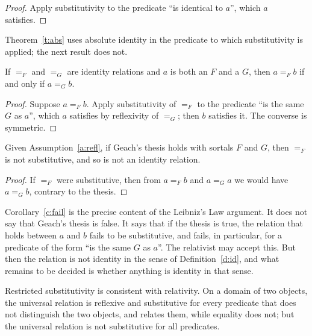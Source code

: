 \documentclass{situationist-preprint}
\begin{document}
\begin{proof}
Apply substitutivity to the predicate \enquote{is identical to $a$}, which $a$ satisfies.
\end{proof}

Theorem~\ref{t:abs} uses absolute identity in the predicate to which substitutivity is applied; the next result does not.

\begin{theorem}\label{t:agree}
If $=_F$ and $=_G$ are identity relations and $a$ is both an $F$ and a $G$, then $a =_F b$ if and only if $a =_G b$.
\end{theorem}

\begin{proof}
Suppose $a =_F b$. Apply substitutivity of $=_F$ to the predicate \enquote{is the same $G$ as $a$}, which $a$ satisfies by reflexivity of $=_G$; then $b$ satisfies it. The converse is symmetric.
\end{proof}

\begin{corollary}\label{c:fail}
Given Assumption~\ref{a:refl}, if Geach's thesis holds with sortals $F$ and $G$, then $=_F$ is not substitutive, and so is not an identity relation.
\end{corollary}

\begin{proof}
If $=_F$ were substitutive, then from $a =_F b$ and $a =_G a$ we would have $a =_G b$, contrary to the thesis.
\end{proof}

Corollary~\ref{c:fail} is the precise content of the Leibniz's Law argument. It does not say that Geach's thesis is false. It says that if the thesis is true, the relation that holds between $a$ and $b$ fails to be substitutive, and fails, in particular, for a predicate of the form \enquote{is the same $G$ as $a$}. The relativist may accept this. But then the relation is not identity in the sense of Definition~\ref{d:id}, and what remains to be decided is whether anything is identity in that sense.

\begin{proposition}\label{p:model}
Restricted substitutivity is consistent with relativity. On a domain of two objects, the universal relation is reflexive and substitutive for every predicate that does not distinguish the two objects, and relates them, while equality does not; but the universal relation is not substitutive for all predicates.
\end{proposition}
\end{document}
